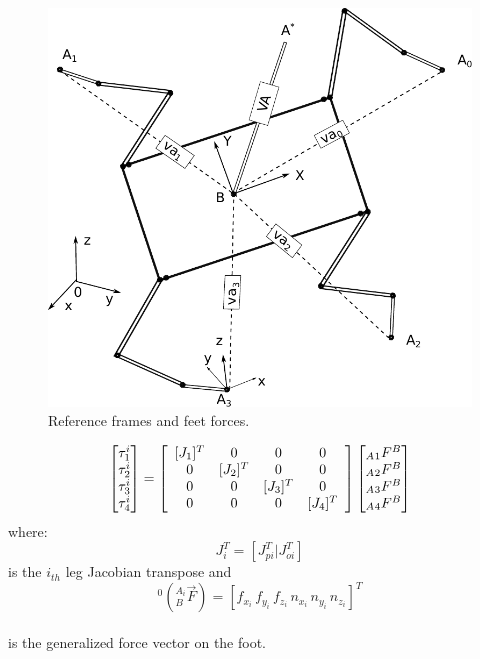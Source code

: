 \documentclass[]{article}
\begin{document}
\begin{figure}[h]
	\centering
	\includegraphics[scale=0.4]{"Figuras/GuaraVirtualActuators"}
	\caption{Reference frames and feet forces.}
	\label{fig:guaravirtualactuators}
\end{figure}
\begin{equation}
\begin{bmatrix}
\tau_1^i 	\\
\tau_2^i	\\
\tau_3^i	\\
\tau_4^i	
\end{bmatrix}
=\left[ \begin{array}{cccc}
	[J_1]^T	& \MVZero	& \MVZero 	& \MVZero 	\\ 
	\MVZero	& [J_2]^T		& \MVZero 	& \MVZero	\\
	\MVZero	& \MVZero	& [J_3]^T		& \MVZero	\\
	\MVZero & \MVZero	& \MVZero	& [J_4]^T		\\
\end{array} \right]	\begin{bmatrix}
_A{_1}F^B	\\
_A{_2}F^B	\\
_A{_3}F^B	\\
_A{_4}F^B
\end{bmatrix}\label{eq:robotJacobian}
\end{equation} 
where: \[J_i^T=\left[J_{pi}^T| J_{oi}^T\right]\] is the $i_{th}$ leg Jacobian transpose and \[^0(_B^{A_i}\vec{F})=[f_{x_i}\,f_{y_i}\,f_{z_i}\,n_{x_i}\,n_{y_i}\,n_{z_i}]^T \]\\
is the generalized force vector on the foot.\\
\end{document}
